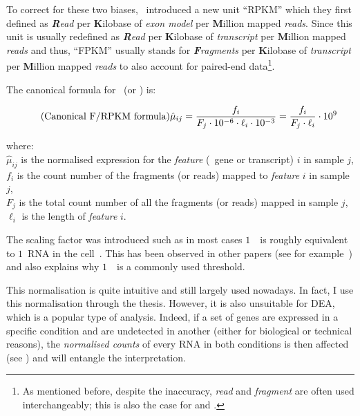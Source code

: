 To correct for these two biases,~\citet{Mortazavi2008} introduced a new unit
\enquote{RPKM} which they first defined as \emph{\textbf{R}ead} per
\textbf{K}ilobase of \emph{exon model} per \textbf{M}illion mapped \emph{reads}.
Since this unit is usually redefined as \emph{\textbf{R}ead} per
\textbf{K}ilobase of \emph{transcript} per \textbf{M}illion mapped \emph{reads}
and thus, \enquote{FPKM} usually stands for  \emph{\textbf{F}ragments} per
\textbf{K}ilobase of \emph{transcript} per \textbf{M}illion mapped \emph{reads}
to also account for paired-end data\footnote{As mentioned before,
despite the inaccuracy, \emph{read} and \emph{fragment} are often used
interchangeably; this is also the case for \emph{\RPKM} and \emph{\FPKM}.}.

The canonical formula for \FPKM\ (or \RPKM) is:

\begin{equation}
    \tag{Canonical F/RPKM formula}\label{eq:rpkm-fx}
\hat{\mu}_{ij}=\frac{f_i}{F_j\cdot10^{-6} \cdot \ell_i\cdot10^{-3}}
              =\frac{f_i}{F_j\cdot\ell_i}\cdot10^{9} \text{\,}
\end{equation}

where: \\{\small
$\hat{\mu}_{ij}$ is the normalised expression for the \emph{feature} (\eg\ gene or
transcript) $i$ in sample $j$,\\
$f_i$ is the count number of the fragments (or reads) mapped to
\emph{feature} $i$ in sample $j$,\\
$F_j$ is the total count number of all the fragments (or reads) mapped in
sample $j$,\\
$\ell_i$ is the length of \emph{feature} $i$.
}

The scaling factor was introduced such as in most cases $1$\ \FPKM\ is
roughly equivalent to $1$\ \gls{RNA} in the cell~. This
has been observed in other papers (see for example~\cite{Hebenstreit:2011}) and
also explains why $1$\ \FPKM\ is a commonly used threshold.%

This normalisation is quite intuitive and still largely used nowadays.
In fact, I use this normalisation through the thesis.
However, it is also unsuitable for
\gls{DEA},
which is a popular type of analysis.
Indeed,
if a set of genes are expressed in a specific condition and are undetected in
another (either for biological or technical reasons), the \emph{normalised counts}
of every \gls{RNA} in both conditions is then affected (see )
and will entangle the interpretation.


